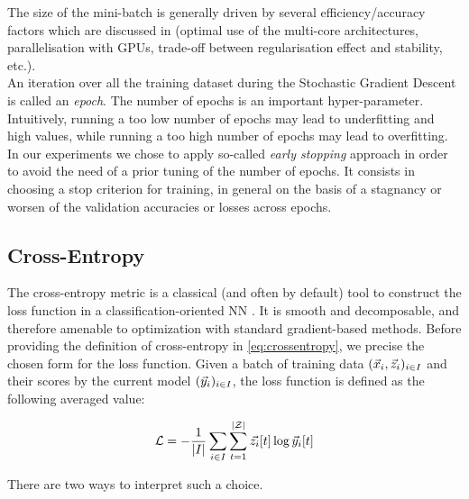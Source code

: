 The size of the mini-batch is generally
driven by several efficiency/accuracy factors which are \eg discussed in
\cite{GBC16} (\eg optimal use of the multi-core architectures, parallelisation
with GPUs, trade-off between regularisation effect and stability, etc.). \\

An iteration over all the training dataset during the Stochastic Gradient Descent is called an \emph{epoch}.
The number of epochs is an important hyper-parameter. Intuitively, running a too low number of epochs may lead to underfitting and high values, while running a too high number of epochs may lead to overfitting. In our experiments we chose to apply so-called \emph{early stopping} approach \cite{Prechelt2012}  in order to avoid the need of a prior tuning of the number of epochs. It consists in choosing a stop criterion for training, in general on the basis of a stagnancy or  worsen of the validation accuracies or losses across epochs.\\

\subsection{Cross-Entropy}
The cross-entropy
metric is a classical (and often by default) tool to construct the loss function in a classification-oriented NN \cite{LCH05,Goodfellow-et-al-2016}. It is smooth and
decomposable, and therefore amenable to optimization with standard
gradient-based methods. Before providing the definition of cross-entropy in \eqref{eq:crossentropy}, we precise the chosen form for the loss function. Given a batch of training data $(\vec{x}_i, \vec{z}_i)_{i\in I}$ and their scores by the current model $(\vec{y}_i)_{i\in I}$, the loss function is defined as the following averaged value:

\begin{equation}\label{eq:lossfunction}
\mathcal{L} = -\frac{1}{\lvert I \rvert} \sum_{i\in I} \sum_{t=1}^{|\mathcal{Z}|}\vec{z_i}[t]\log{\ensuremath {\vec{y}}_i[t]}
\end{equation}   

There are two ways to interpret such a choice. 

